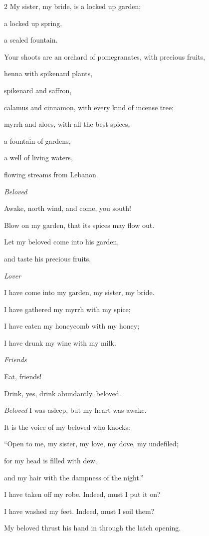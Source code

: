 \begin{multicols}{2}
\myverse{}My sister, my bride, is a locked up garden;

a locked up spring,

a sealed fountain.

\myverse{}Your shoots are an orchard of pomegranates, with precious fruits,

henna with spikenard plants,

\myverse{}spikenard and saffron,

calamus and cinnamon, with every kind of incense tree;

myrrh and aloes, with all the best spices,

\myverse{}a fountain of gardens,

a well of living waters,

flowing streams from Lebanon.


\textit{Beloved}

\myverse{}Awake, north wind, and come, you south!

Blow on my garden, that its spices may flow out.

Let my beloved come into his garden,

and taste his precious fruits.


\mychapter{}\textit{Lover}

\myverse*{}I have come into my garden, my sister, my bride.

I have gathered my myrrh with my spice;

I have eaten my honeycomb with my honey;

I have drunk my wine with my milk.

\textit{Friends}

Eat, friends!

Drink, yes, drink abundantly, beloved.


\textit{Beloved}
\myverse{}I was asleep, but my heart was awake.

It is the voice of my beloved who knocks:

“Open to me, my sister, my love, my dove, my undefiled;

for my head is filled with dew,

and my hair with the dampness of the night.”

\myverse{}I have taken off my robe. Indeed, must I put it on?

I have washed my feet. Indeed, must I soil them?

\myverse{}My beloved thrust his hand in through the latch opening.


\end{multicols}
